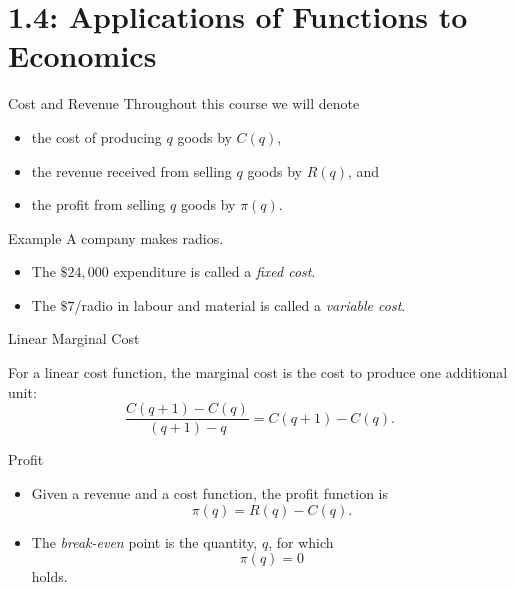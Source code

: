 \documentclass[Lecture.tex]{subfiles}
\begin{document}
\section{1.4: Applications of Functions to Economics}

\begin{frame}{Cost and Revenue}
  Throughout this course we will denote
  \begin{itemize}
    \item<2->
      the cost of producing $q$ goods by $C(q)$,
    \item<3->
      the revenue received from selling $q$ goods by $R(q)$, and
    \item<4->
      the profit from selling $q$ goods by $\pi(q)$.
  \end{itemize}
\end{frame}

\begin{frame}{Example}
  A company makes radios.
  \begin{itemize}
  \item<5->
    The $\$24,000$ expenditure is called a {\it fixed cost}.
  \item<6->
    The $\$7$/radio in labour and material is called a {\it variable cost}.
  \end{itemize}
\end{frame}

\begin{frame}{Linear Marginal Cost}
  \begin{defn}
    For a linear cost function, the marginal cost is the cost to produce one additional unit:
    $$\frac{C(q + 1) - C(q)}{(q + 1) - q} = C(q + 1) - C(q).$$
  \end{defn}
\end{frame}

\begin{frame}{Profit}
  \begin{defn}
    \begin{itemize}
    \item<1->
      Given a revenue and a cost function, the profit function is
      $$\pi(q) = R(q) - C(q).$$
    \item<2->
      The {\it break-even} point is the quantity, $q$, for which
      $$\pi(q) = 0$$
      holds.
    \end{itemize}
  \end{defn}
\end{frame}
\end{document}
